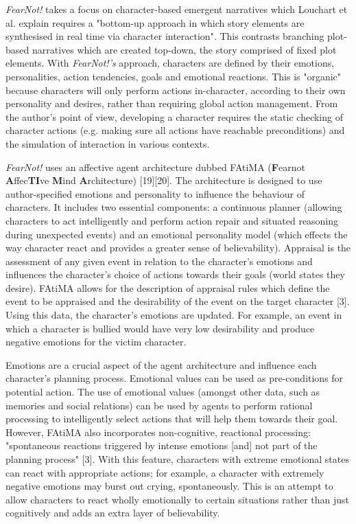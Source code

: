\documentclass{sig-alternate-05-2015}
\begin{document}
\textit{FearNot!} takes a focus on character-based emergent narratives which Louchart et al. explain requires a "bottom-up approach in which story elements are synthesised in real time via character interaction". This contrasts branching plot-based narratives which are created top-down, the story comprised of fixed plot elements. With \textit{FearNot!'s} approach, characters are defined by their emotions, personalities, action tendencies, goals and emotional reactions. This is "organic" because characters will only perform actions in-character, according to their own personality and desires, rather than requiring global action management. From the author's point of view, developing a character requires the static checking of character actions (e.g. making sure all actions have reachable preconditions) and the simulation of interaction in various contexts.

\textit{FearNot!} uses an affective agent architecture dubbed FAtiMA (\textbf{F}earnot \textbf{A}ffec\textbf{TI}ve \textbf{M}ind \textbf{A}rchitecture) [19][20]. The architecture is designed to use author-specified emotions and personality to influence the behaviour of characters. It includes two essential components: a continuous planner (allowing characters to act intelligently and perform action repair and situated reasoning during unexpected events) and an emotional personality model (which effects the way character react and provides a greater sense of believability). Appraisal is the assessment of any given event in relation to the character's emotions and influences the character's choice of actions towards their goals (world states they desire). FAtiMA allows for the description of appraisal rules which define the event to be appraised and the desirability of the event on the target character [3]. Using this data, the character's emotions are updated. For example, an event in which a character is bullied would have very low desirability and produce negative emotions for the victim character.

Emotions are a crucial aspect of the agent architecture and influence each character's planning process. Emotional values can be used as pre-conditions for potential action. The use of emotional values (amongst other data, such as memories and social relations) can be used by agents to perform rational processing to intelligently select actions that will help them towards their goal. However, FAtiMA also incorporates non-cognitive, reactional processing: "spontaneous reactions triggered by intense emotions [and] not part of the planning process" [3]. With this feature, characters with extreme emotional states can react with appropriate actions; for example, a character with extremely negative emotions may burst out crying, spontaneously. This is an attempt to allow characters to react wholly emotionally to certain situations rather than just cognitively and adds an extra layer of believability.
\end{document}
